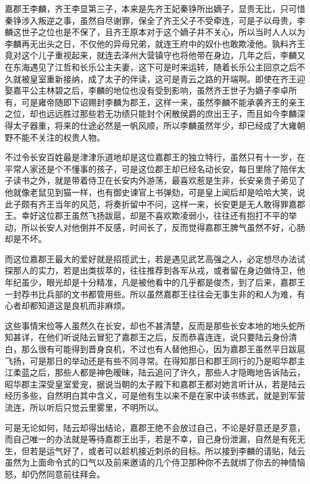 嘉郡王李麟，齐王李显第三子，本来是先齐王妃秦铮所出嫡子，显贵无比，只可惜秦铮涉入叛逆之事，虽然自尽谢罪，保全了齐王父子不受牵连，可是子以母贵，李麟这世子之位也是不保了，且齐王原本对于这个嫡子并不关心，所以当时人人以为李麟再无出头之日，不仅他的异母兄弟，就连王府中的奴仆也敢欺凌他。孰料齐王竟对这个儿子重视起来，就连去泽州大营镇守也将他带在身边，几年之后，李麟又在东海遇见了江哲和长乐公主夫妻，这下可是时来运转，随着长乐公主回京之后不久就被皇室重新接纳，成了太子的伴读，这可是青云之路的开端啊。即使在齐王迎娶嘉平公主林碧之后，李麟的地位也没有受到影响，虽然齐王世子为嫡子李卓所有，可是雍帝随即下诏赐封李麟为郡王，这样一来，虽然李麟不能承袭齐王的亲王之位，却也远远胜过那些若无功绩只能封个闲散侯爵的庶出王子，而且如今李麟深得太子器重，将来的仕途必然是一帆风顺，所以李麟虽然年少，却已经成了大雍朝野不能不关注的权贵人物。

不过令长安百姓最是津津乐道地却是这位嘉郡王的独立特行，虽然只有十一岁，在平常人家还是个不懂事的孩子，可是这位郡王却已经名动长安，每日里除了陪伴太子读书之外，就是带着侍卫在长安内外游荡，最喜欢惹是生非，长安亲贵子弟见了他就像老鼠见到猫一样，也有御史谏官上书弹劾，可是皇上闻后却是哈哈大笑，说此子颇有齐王当年的风范，将奏折留中不问，这样一来，长安更是无人敢得罪嘉郡王。幸好这位郡王虽然飞扬跋扈，却是不喜欢欺凌弱小，往往还有抱打不平的举动，所以长安人对他倒并不反感，时间长了，反而觉得嘉郡王脾气虽然不好，心肠却是不坏。

而这位嘉郡王最大的爱好就是招揽武士，若是遇见武艺高强之人，必定想尽办法试探那人的实力，若是出类拔萃的，往往推荐到各军从戎，或者留在身边做侍卫，他年纪虽少，眼光却是十分精准，凡是被他看中的几乎都是俊杰，到了后来，嘉郡王一封荐书比兵部的文书都管用些。所以虽然嘉郡王往往会无事生非的和人为难，有心者却都知道这是良机而非麻烦。

这些事情宋俭等人虽然久在长安，却也不甚清楚，反而是那些长安本地的地头蛇所知甚详，在他们听说陆云冒犯了嘉郡王之后，反而恭喜连连，说只要陆云身份清白，那么很有可能得到晋身良机，不过也有人替他担心，因为嘉郡王虽然平日跋扈飞扬，可是那日的举动还是有些不同寻常。在得知那日和郡王同行的乃是昭华郡主江柔蓝之后，那些人都是神色暧昧，陆云追问了许久，那些人才隐晦地告诉陆云，昭华郡主深受皇室爱宠，据说当朝的太子殿下和嘉郡王都对她言听计从，若是陆云经历多些，自然明白其中含义，可是他有生以来不是在家中读书练武，就是到军营流连，所以听后只觉云里雾里，不明所以。

可是无论如何，陆云却得出结论，嘉郡王绝不会放过自己，不论是好意还是歹意，而自己唯一的办法就是等待嘉郡王出手，若是不幸，自己身份泄漏，自然是有死无生，但若是运气好了，或者可以趁机接近刺杀的目标。所以接到李麟的请贴，陆云虽然为上面命令式的口气以及前来邀请的几个侍卫那种你不去就绑了你去的神情恼怒，却仍然同意前往拜会。

